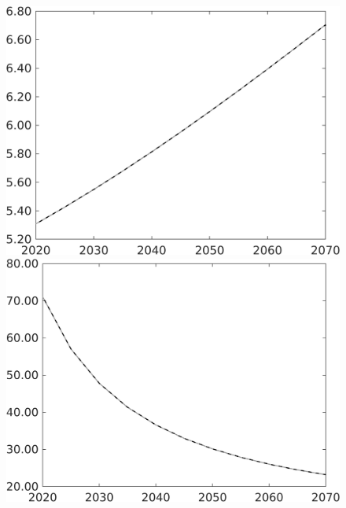 \begin{figure}[h!!]
\begin{minipage}[]{0.32\textwidth}
\end{minipage}	
\begin{minipage}[]{0.32\textwidth}
\includegraphics[width=1\textwidth]{../../codding_model/own_basedOnFried/optimalPol_010922_revision/figures/all_13Sept22/CompTaul_Equlab_LFBAU_Reg0_gAn_spillover0_nsk1_xgr1_knspil0_sep1_countec0_GovRev0_etaa0.79_lgd0.png}
\end{minipage}	
\begin{minipage}[]{0.32\textwidth}
\includegraphics[width=1\textwidth]{../../codding_model/own_basedOnFried/optimalPol_010922_revision/figures/all_13Sept22/CompTaul_Equlab_LFBAU_Reg0_gAg_spillover0_nsk1_xgr1_knspil0_sep1_countec0_GovRev0_etaa0.79_lgd0.png}

\end{minipage}
\end{figure}
